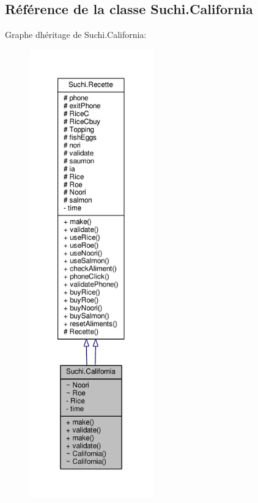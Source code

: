 \hypertarget{classSuchi_1_1California}{}\subsection{Référence de la classe Suchi.\+California}
\label{classSuchi_1_1California}


Graphe d\textquotesingle{}héritage de Suchi.\+California\+:\nopagebreak
\begin{figure}[H]
\begin{center}
\leavevmode
\includegraphics[height=550pt]{classSuchi_1_1California__inherit__graph}
\end{center}
\end{figure}


